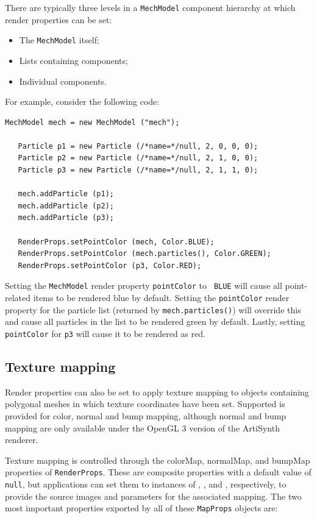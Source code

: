 There are typically three levels in a {\tt MechModel} component
hierarchy at which render properties can be set:

\begin{itemize}

\item The {\tt MechModel} itself;

\item Lists containing components;

\item Individual components.

\end{itemize}

For example, consider the following code:
%
\begin{lstlisting}[]
   MechModel mech = new MechModel ("mech");

   Particle p1 = new Particle (/*name=*/null, 2, 0, 0, 0);
   Particle p2 = new Particle (/*name=*/null, 2, 1, 0, 0);
   Particle p3 = new Particle (/*name=*/null, 2, 1, 1, 0);

   mech.addParticle (p1);
   mech.addParticle (p2);
   mech.addParticle (p3);

   RenderProps.setPointColor (mech, Color.BLUE);
   RenderProps.setPointColor (mech.particles(), Color.GREEN);
   RenderProps.setPointColor (p3, Color.RED);   
\end{lstlisting}
%
Setting the {\tt MechModel} render property {\tt pointColor} to {\tt
BLUE} will cause all point-related items to be rendered blue by
default. Setting the {\tt pointColor} render property for the particle
list (returned by {\tt mech.particles()}) will override this and cause
all particles in the list to be rendered green by default. Lastly,
setting {\tt pointColor} for {\tt p3} will cause it to be rendered as
red.

\subsection{Texture mapping}
\label{TextureMapping:sec}

Render properties can also be set to apply texture mapping to objects
containing polygonal meshes in which texture coordinates have been
set. Supported is provided for color, normal and bump mapping,
although normal and bump mapping are only available under the OpenGL 3
version of the ArtiSynth renderer.

Texture mapping is controlled through the {\sf colorMap}, {\sf
normalMap}, and {\sf bumpMap} properties of {\tt RenderProps}.  These
are composite properties with a default value of {\tt null}, but
applications can set them to instances of
,
, and
, respectively, to provide the
source images and parameters for the associated mapping. The two
most important properties exported by all of these
{\tt MapProps} objects are:

